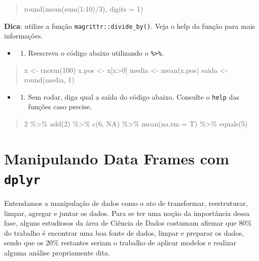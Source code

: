 \documentclass[a4paper]{book}
\providecommand{\tightlist}{%
  \setlength{\itemsep}{0pt}\setlength{\parskip}{0pt}}
\begin{document}
\begin{quote}
round(mean(sum(1:10)/3), digits = 1)
\end{quote}

\textbf{Dica}: utilize a função \texttt{magrittr::divide\_by()}. Veja o help da função para mais informações.

\begin{itemize}
\item
  \begin{enumerate}
  \def\labelenumi{\arabic{enumi}.}
  \setcounter{enumi}{1}
  \tightlist
  \item
    Reescreva o código abaixo utilizando o \texttt{\%\textgreater{}\%}.
  \end{enumerate}
\end{itemize}

\begin{quote}
x \textless- rnorm(100)
x.pos \textless- x{[}x\textgreater0{]}
media \textless- mean(x.pos)
saida \textless- round(media, 1)
\end{quote}

\begin{itemize}
\item
  \begin{enumerate}
  \def\labelenumi{\arabic{enumi}.}
  \setcounter{enumi}{2}
  \tightlist
  \item
    Sem rodar, diga qual a saída do código abaixo. Consulte o \texttt{help} das funções caso precise.
  \end{enumerate}
\end{itemize}

\begin{quote}
2 \%\textgreater\%
add(2) \%\textgreater\%
c(6, NA) \%\textgreater\%
mean(na.rm = T) \%\textgreater\%
equals(5)
\end{quote}

\hypertarget{method}{%
\chapter{\texorpdfstring{Manipulando Data Frames com \texttt{dplyr}}{Manipulando Data Frames com dplyr}}\label{method}}

Entendamos a manipulação de dados como o ato de transformar, reestruturar, limpar, agregar e juntar os dados. Para se ter uma noção da importância dessa fase, alguns estudiosos da área de Ciência de Dados costumam afirmar que 80\% do trabalho é encontrar uma boa fonte de dados, limpar e preparar os dados, sendo que os 20\% restantes seriam o trabalho de aplicar modelos e realizar alguma análise propriamente dita.
\end{document}

